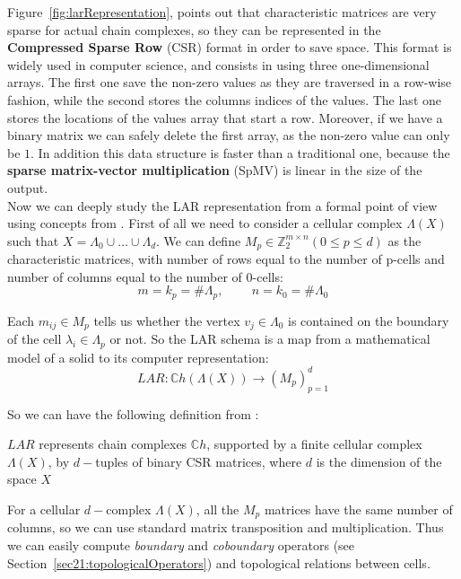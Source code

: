 Figure~\ref{fig:larRepresentation}, points out that characteristic matrices are very sparse for actual chain complexes, so they can be represented in the \textbf{Compressed Sparse Row} (CSR) format in order to save space. This format is widely used in computer science, and consists in using three one-dimensional arrays. The first one save the non-zero values as they are traversed in a row-wise fashion, while the second stores the columns indices of the values. The last one stores the locations of the values array that start a row. Moreover, if we have a binary matrix we can safely delete the first array, as the non-zero value can only be $1$. In addition this data structure is faster than a traditional one, because the \textbf{sparse matrix-vector multiplication} (SpMV) is linear in the size of the output.\\

Now we can deeply study the LAR representation from a formal point of view using concepts from \cite{DiCarlo}. First of all we need to consider a cellular complex $\Lambda(X)$ such that $X = \Lambda_{0} \cup \dots \cup \Lambda_{d}$. We can define $M_{p} \in \mathbb{Z}_{2}^{m\times n} (0\leq p \leq d)$ as the characteristic matrices, with number of rows equal to the number of p-cells and number of columns equal to the number of 0-cells:
\begin{equation}
 m = k_{p} = \#\Lambda_{p}, \; \; \; \; \; \; \; \; n = k_{0} = \#\Lambda_{0}
\end{equation}

Each $m_{ij} \in M_{p}$ tells us whether the vertex $v_{j} \in \Lambda_{0}$ is contained on the boundary of the cell $\lambda_{i} \in \Lambda_{p}$ or not. So the LAR schema is a map from a mathematical model of a solid to its computer representation:
\begin{equation}
 LAR \colon \mathbb{C}h(\Lambda(X)) \rightarrow (M_{p})^{d}_{p=1}
\end{equation}

So we can have the following definition from \cite{DiCarlo}:
\begin{definition}
 $LAR$ represents chain complexes $\mathbb{C}h$, supported by a finite cellular complex $\Lambda(X)$, by $d-$tuples of binary CSR matrices, where $d$ is the dimension of the space $X$
\end{definition}

For a cellular $d-$complex $\Lambda(X)$, all the $M_{p}$ matrices have the same number of columns, so we can use standard matrix transposition and multiplication. Thus we can easily compute \textit{boundary} and \textit{coboundary} operators (see Section~\ref{sec21:topologicalOperators}) and topological relations between cells.\\

